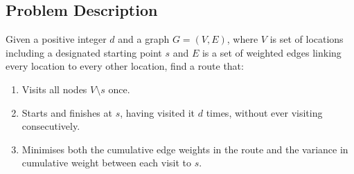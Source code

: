 \subsection{Problem Description}\label{subsec:problem-description}
Given a positive integer $d$ and a graph $G = (V, E)$, where $V$ is set of locations including a designated
starting point $s$ and $E$ is a set of weighted edges linking every location to every other location, find a route
that:
\begin{enumerate}
    \item Visits all nodes $V \setminus s$ once.
    \item Starts and finishes at $s$, having visited it $d$ times, without ever visiting consecutively.
    \item Minimises both the cumulative edge weights in the route and the variance in cumulative weight between
    each visit to $s$.
\end{enumerate}


